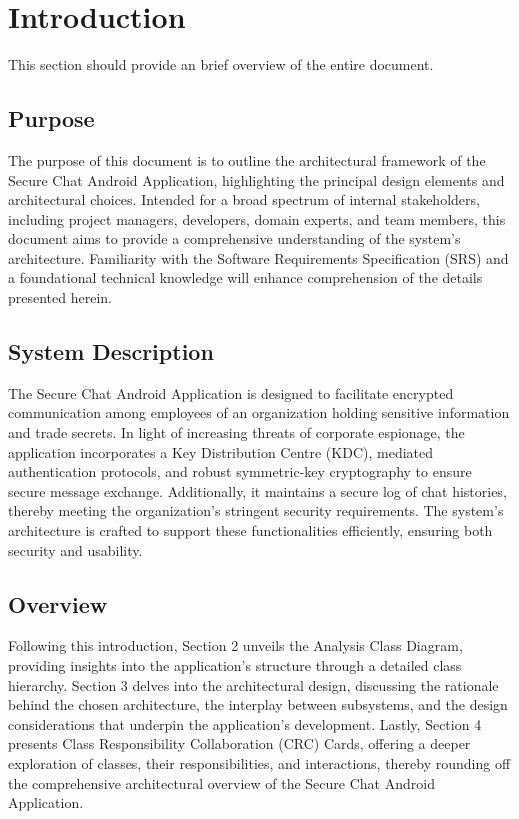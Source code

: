 \documentclass[]{article}
\begin{document}
\newpage
\section{Introduction}
\label{sec:introduction}

This section should provide an brief overview of the entire document.

\subsection{Purpose}
\label{sub:purpose}
The purpose of this document is to outline the architectural framework of the Secure Chat Android Application, highlighting the principal design elements and architectural choices. Intended for a broad spectrum of internal stakeholders, including project managers, developers, domain experts, and team members, this document aims to provide a comprehensive understanding of the system’s architecture. Familiarity with the Software Requirements Specification (SRS) and a foundational technical knowledge will enhance comprehension of the details presented herein.

\subsection{System Description}
\label{sub:system_description}
The Secure Chat Android Application is designed to facilitate encrypted communication among employees of an organization holding sensitive information and trade secrets. In light of increasing threats of corporate espionage, the application incorporates a Key Distribution Centre (KDC), mediated authentication protocols, and robust symmetric-key cryptography to ensure secure message exchange. Additionally, it maintains a secure log of chat histories, thereby meeting the organization's stringent security requirements. The system's architecture is crafted to support these functionalities efficiently, ensuring both security and usability.


\subsection{Overview}
\label{sub:overview}
Following this introduction, Section 2 unveils the Analysis Class Diagram, providing insights into the application's structure through a detailed class hierarchy. Section 3 delves into the architectural design, discussing the rationale behind the chosen architecture, the interplay between subsystems, and the design considerations that underpin the application's development. Lastly, Section 4 presents Class Responsibility Collaboration (CRC) Cards, offering a deeper exploration of classes, their responsibilities, and interactions, thereby rounding off the comprehensive architectural overview of the Secure Chat Android Application.
\end{document}
